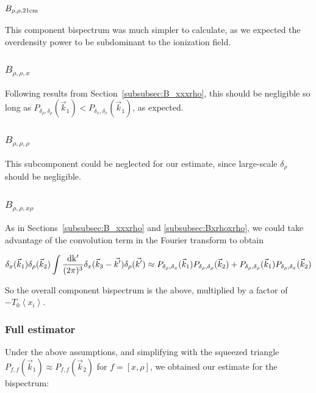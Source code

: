 \subsubsection{$B_{\rho,\rho,{\rm 21cm}}$}
\label{subsec:B_rhorho21}

This component bispectrum was much simpler to calculate, as we expected the overdensity power to be subdominant to the ionization field.

\subsubsection*{$B_{\rho,\rho,x}$}
\label{subsubsec:Brhorhox}
Following results from Section~\ref{subsubsec:B_xxxrho}, this should be negligible so long as $P_{\delta_{\rho},\delta_{\rho}}(\vec{k}_1) < P_{\delta_{x},\delta_{x}}(\vec{k}_1)$, as expected.

\subsubsection*{$B_{\rho,\rho,\rho}$}
\label{subsubsec:Brhorhorho}
This subcomponent could be neglected for our estimate, since large-scale $\delta_{\rho}$ should be negligible.

\subsubsection*{$B_{\rho,\rho,x\rho}$}
\label{subsubsec:Brhorhoxrho}

As in Sections~\ref{subsubsec:B_xxxrho} and \ref{subsubsec:Bxrhoxrho}, we could take advantage of the convolution term in the Fourier transform to obtain

\begin{equation}
\delta_x(\vec{k}_1)\delta_{\rho}(\vec{k}_2) \int \frac{\rm{d}k'}{(2\pi)^3}\delta_x(\vec{k}_3-\vec{k'})\delta_{\rho}(\vec{k'})
\approx
P_{\delta_{\rho},\delta_x}(\vec{k}_1)P_{\delta_{\rho},\delta_{\rho}}(\vec{k}_2) + P_{\delta_{\rho},\delta_{\rho}}(\vec{k}_1)P_{\delta_{\rho},\delta_x}(\vec{k}_2)
\end{equation}

So the overall component bispectrum is the above, multiplied by a factor of $-T_0\left\langle x_i \right\rangle$.

\subsubsection{Full estimator}

Under the above assumptions, and simplifying with the squeezed triangle $P_{f,f}(\vec{k}_1)\approx P_{f,f}(\vec{k}_2)$ for $f=[x,\rho]$, we obtained our estimate for the bispectrum:

